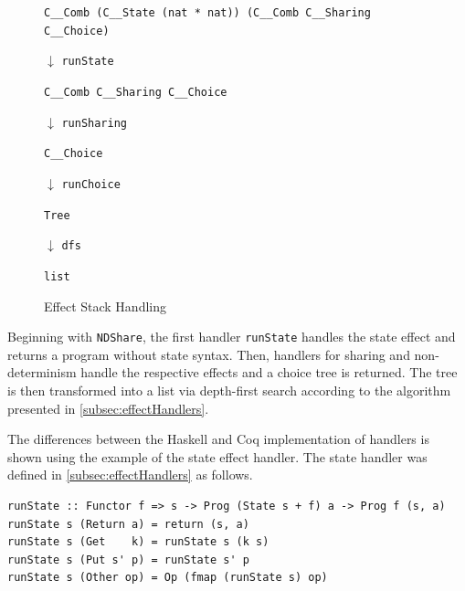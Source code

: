 \documentclass[a4paper, 11pt, fleqn, twoside]{scrreprt}
\newcommand{\cinl}[1]{\texttt{#1}}
\begin{document}
\begin{figure}[H]
{\centering \cinl{C__Comb (C__State (nat * nat)) (C__Comb C__Sharing C__Choice)} \par}

\hspace*{.48\textwidth} {\Large \boldmath $\downarrow$} \texttt{runState}

{\centering \cinl{C__Comb C__Sharing C__Choice} \par}

\hspace*{.48\textwidth} {\Large \boldmath $\downarrow$} \texttt{runSharing}

{\centering \cinl{C__Choice} \par}

\hspace*{.48\textwidth} {\Large \boldmath $\downarrow$} \texttt{runChoice}

{\centering \cinl{Tree} \par}

\hspace*{.48\textwidth} {\Large \boldmath $\downarrow$} \texttt{dfs}

{\centering \cinl{list} \par}
\caption{Effect Stack Handling}
\label{fig:effectStackHandling}
\end{figure}

Beginning with \cinl{NDShare}, the first handler \cinl{runState} handles the state effect and returns a program without state syntax.
Then, handlers for sharing and non-determinism handle the respective effects and a choice tree is returned.
The tree is then transformed into a list via depth-first search according to the algorithm presented in \autoref{subsec:effectHandlers}.

The differences between the Haskell and Coq implementation of handlers is shown using the example of the state effect handler.
The state handler was defined in \autoref{subsec:effectHandlers} as follows.

\begin{verbatim}
runState :: Functor f => s -> Prog (State s + f) a -> Prog f (s, a)
runState s (Return a) = return (s, a)
runState s (Get    k) = runState s (k s)
runState s (Put s' p) = runState s' p
runState s (Other op) = Op (fmap (runState s) op)
\end{verbatim}
\end{document}

